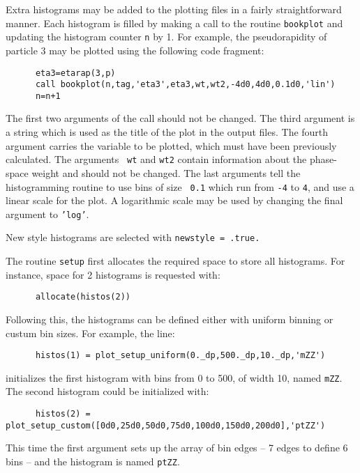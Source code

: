 Extra histograms may be added to the plotting files in
a fairly straightforward manner. Each histogram is filled by making
a call to the routine {\tt bookplot} and updating the histogram
counter {\tt n} by 1. For example, the pseudorapidity of particle $3$
may be plotted using the following code fragment:

\begin{verbatim}
      eta3=etarap(3,p)
      call bookplot(n,tag,'eta3',eta3,wt,wt2,-4d0,4d0,0.1d0,'lin')
      n=n+1
\end{verbatim}
The first two arguments of the call should not be changed. The third
argument is a string which is used as the title of the plot in the
output files. The fourth argument carries the variable to
be plotted, which must have been previously calculated. The arguments {\tt
	wt} and {\tt wt2} contain information about the phase-space weight and
should not be changed. The
last arguments tell the histogramming routine to use bins of size {\tt
	0.1} which run from {\tt -4} to {\tt 4}, and use a linear scale for
the plot. A logarithmic scale may be used by changing the final
argument to {\tt 'log'}.


\label{sec:newhistos}

New style histograms are selected with {\tt newstyle = .true.}

The routine {\tt setup} first allocates the required space to store
all histograms.  For instance, space for 2 histograms is requested with:
\begin{verbatim}
      allocate(histos(2))
\end{verbatim}
Following this, the histograms can be defined either with uniform binning
or custum bin sizes.  For example, the line:
\begin{verbatim}
      histos(1) = plot_setup_uniform(0._dp,500._dp,10._dp,'mZZ')
\end{verbatim}
initializes the first histogram with bins from 0 to 500, of width 10, named
{\tt mZZ}.  The second histogram could be initialized with:
\begin{verbatim}
      histos(2) = plot_setup_custom([0d0,25d0,50d0,75d0,100d0,150d0,200d0],'ptZZ')
\end{verbatim}
This time the first argument sets up the array of bin edges -- 7 edges
to define 6 bins -- and the histogram is named {\tt ptZZ}.

